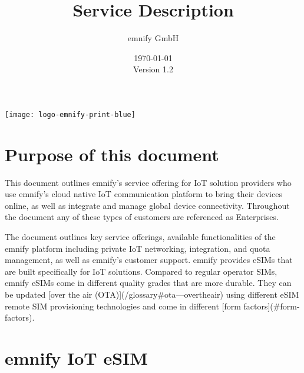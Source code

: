 \documentclass[11pt, oneside]{article}   	%
\newcommand{\addspace}{\vspace{2mm}}
\begin{document}
\title{Service Description}
\author{emnify GmbH}
\date{\today \\ \addspace Version 1.2}
\maketitle

\begin{center}
  \texttt{[image: logo-emnify-print-blue]}
\end{center}

\pagebreak[4]

\tableofcontents

\pagebreak[4]

\section{Purpose of this document}

\begin{markdown}

This document outlines emnify's service offering for IoT solution providers who use emnify's cloud native IoT communication platform to bring their devices online, as well as integrate and manage global device connectivity.
Throughout the document any of these types of customers are referenced as Enterprises. 

The document outlines key service offerings, available functionalities of the emnify platform including private IoT networking, integration, and quota management, as well as emnify's customer support.  
emnify provides eSIMs that are built specifically for IoT solutions.
Compared to regular operator SIMs, emnify eSIMs come in different quality grades that are more durable.
They can be updated [over the air (OTA)](/glossary#ota---overtheair) using different eSIM remote SIM provisioning technologies and come in different [form factors](#form-factors).

\end{markdown}

\section{emnify IoT eSIM}
\end{document}
